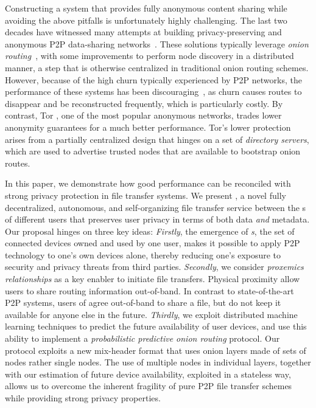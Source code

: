 Constructing a system that provides fully anonymous content sharing while avoiding the above pitfalls is unfortunately highly
challenging. The last two decades have witnessed many attempts at building privacy-preserving and anonymous P2P data-sharing
networks~\cite{Clarke:2001,Gnunet2002,Freedman:2002,Nambiar:2006,Rennhard:2002}.
These solutions typically leverage \emph{onion
 routing}~\cite{Chaum:1981}, with some improvements to perform node
 discovery in a distributed manner, a step that is otherwise
centralized in traditional onion routing schemes. However, because of the high
churn typically experienced by P2P networks, the performance of these systems has been
discouraging~\cite{LeBlond:2013}, as churn causes routes to disappear and be
reconstructed frequently, which is particularly costly. By contrast, Tor
\cite{Tor}, one of the most popular anonymous networks,
trades lower anonymity guarantees for a much better
performance.  Tor's lower protection arises from
a partially centralized design that hinges on a set of \emph{directory
servers}, which are used to advertise trusted nodes that are available to bootstrap onion
routes. 

In this paper, we demonstrate how good performance can be reconciled
with strong privacy protection in file transfer systems. We present
\name{}, a novel fully decentralized, autonomous,
and self-organizing file transfer service between the \squad{}s of different users that preserves user privacy
in terms of both data \emph{and} metadata.  Our proposal hinges on three
key ideas: \emph{Firstly}, the emergence of \emph{\squad{}s}, the set of connected devices owned and used by one user, 
makes it possible to apply P2P technology to one's own devices
alone, thereby reducing one's exposure to security and privacy threats
from third parties. \emph{Secondly}, we consider \emph{proxemics relationships} as a key enabler to initiate file
transfers. Physical proximity allow users to share
routing information out-of-band.
In contrast to state-of-the-art P2P systems, users of \name agree out-of-band to share a file, but
do not keep it available for anyone else in the future. \emph{Thirdly}, we
exploit distributed machine learning techniques to predict the future
availability of user devices, and use this ability to implement a
\emph{probabilistic predictive onion routing} protocol. Our protocol exploits a new mix-header format that uses onion layers made of sets of nodes rather single nodes. The use of multiple nodes in individual layers, together with our estimation of future device availability, exploited in a stateless way, allows
us to overcome the inherent fragility of pure P2P file transfer schemes while providing strong privacy properties. 

